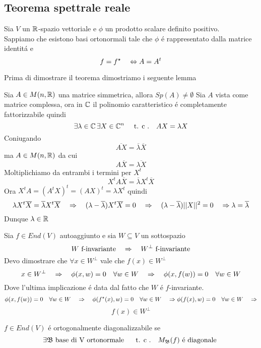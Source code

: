 \newpage
\subsection{Teorema spettrale reale}
Sia $V$ un $\mathbb{R}$-spazio vettoriale e $\phi$ un prodotto scalare definito positivo.\\
Sappiamo che esistono basi ortonormali tale che $\phi$ \'e rappresentato dalla matrice identit\'a e 
$$ f= f^\star \quad \Leftrightarrow A=A^t$$

Prima di dimostrare il teorema dimostriamo i seguente lemma 
\begin{lem} \label{spet1}
Sia $A\in M(n,\mathbb{R})$ una matrice simmetrica, allora $Sp(A)\not = \emptyset$
\proof
Sia $A$ vista come matrice complessa, ora in $\mathbb{C}$ il polinomio caratteristico \'e completamente fattorizzabile quindi
$$ \exists \lambda \in \mathbb{C} \, \exists X \in \mathbb{C}^n \quad \text{ t. c .} \quad AX = \lambda X $$
Coniugando 
$$\overline{AX}=\overline{\lambda} \overline{X}$$
ma $A \in M(n,\mathbb{R}) $ da cui
$$ A\overline{X}= \overline{\lambda X}$$
Moltiplichiamo da entrambi i termini per $X^t$
$$ X^t A  \overline{X} = \overline{\lambda} X^t \overline{X}$$ 
Ora $X^t A= (A^tX)^t = (AX)^t = \lambda X^t $ quindi
$$ \lambda X^t \overline{X}= \overline{\lambda} X^t \overline{X} \quad \Rightarrow \quad ( \lambda-\overline{\lambda}) X^t \overline{X}=0 \quad \Rightarrow \quad (\lambda-\overline{\lambda}) \vert \vert X \vert \vert ^2 =0 \quad \Rightarrow \lambda=\overline{\lambda}$$
Dunque $\lambda\in \mathbb{R} $
\endproof
\end{lem}
\spazio
\begin{lem}\label{spet2}
Sia $f \in End(V) $ autoaggiunto e sia $W\subseteq V $ un sottospazio
$$ W \text{ f-invariante} \quad \Rightarrow \quad W^\perp \text{ f-invariante} $$
\proof
Devo dimostrare che $\forall x \in W^\perp $ vale che $f(x) \in W^\perp$\\
$$ x \in W^\perp \quad
 \Rightarrow \quad \phi(x,w) = 0 \quad \forall w \in W \quad \Rightarrow \quad \phi(x,f(w))=0 \quad \forall w \in W $$
Dove l'ultima implicazione \'e data dal fatto che $W$ \'e $f$-invariante.\\
$$ \phi(x,f(w))=0 \quad \forall w \in W \quad \Rightarrow \quad \phi (f^\star(x), w)=0 \quad \forall w \in W \quad \Rightarrow \phi(f(x), w) =0 \quad \forall w \in W \quad \Rightarrow $$ $$  f(x)\in W^\perp$$
\endproof
 \end{lem}
\newpage
\begin{defn}\bianco
$f \in End(V) $ \'e ortogonalmente diagonalizzabile se 
$$ \exists \mathfrak{B} \text{ base di V  ortonormale } \quad \text{ t. c .} \quad M_{\mathfrak{B}} (f) \text{ \'e diagonale } $$
\end{defn}

